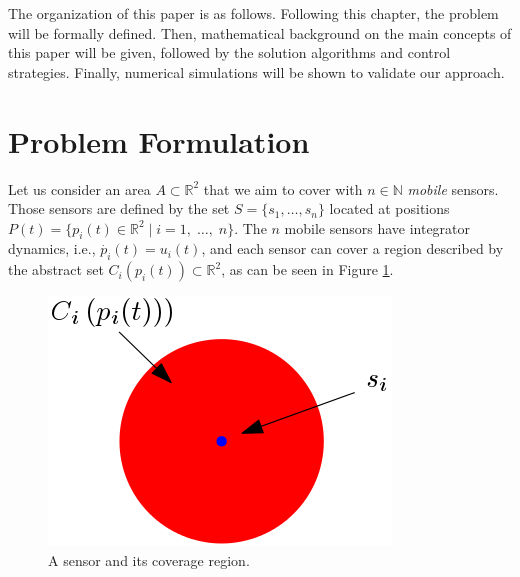 \documentclass{iacas}
\newcommand{\rsqr}{\mathbb{R}^2}
\begin{document}
The organization of this paper is as follows.  Following this chapter, the problem will be formally defined. Then, mathematical background on the main concepts of this paper will be given, followed by the solution algorithms and control strategies. Finally, numerical simulations will be shown to validate our approach.

\section{Problem Formulation}
Let us consider an area $A \subset \rsqr$ that we aim to cover with $n \in \mathbb{N}$ \emph{mobile} sensors. Those sensors are defined by the set $S = \{s_1, \ldots, s_n\}$ located at positions $P(t) = \{ p_i (t) \in \rsqr \mid i = 1,\; \ldots ,\; n\}$. The $n$ mobile sensors have integrator dynamics, i.e., $\dot{p_i}(t)=u_i(t)$, and each sensor can cover a region described by the abstract set $C_i \left( p_i(t) \right) \subset \rsqr$, as can be seen in Figure \ref{fig:coverage region exmaple}.

\begin{figure}[H]
\centering
\includegraphics[scale=0.6]{figures/problem-def/sensor-and-coverage.png}
\caption{A sensor and its coverage region.}%
\label{fig:coverage region exmaple}
\end{figure}
\end{document}
